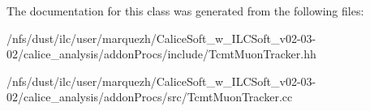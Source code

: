 The documentation for this class was generated from the following files\-:\begin{DoxyCompactItemize}
\item 
/nfs/dust/ilc/user/marquezh/\-Calice\-Soft\-\_\-w\-\_\-\-I\-L\-C\-Soft\-\_\-v02-\/03-\/02/calice\-\_\-analysis/addon\-Procs/include/Tcmt\-Muon\-Tracker.\-hh\item 
/nfs/dust/ilc/user/marquezh/\-Calice\-Soft\-\_\-w\-\_\-\-I\-L\-C\-Soft\-\_\-v02-\/03-\/02/calice\-\_\-analysis/addon\-Procs/src/Tcmt\-Muon\-Tracker.\-cc\end{DoxyCompactItemize}
